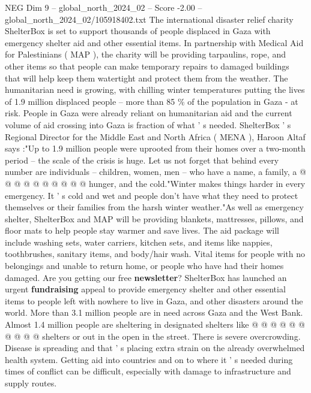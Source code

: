 \begin{textsample}{NEG Dim 9 – global\_north\_2024\_02 – Score -2.00 – global\_north\_2024\_02/105918402.txt}  \label{ex:f9_neg_239}
The international disaster relief charity ShelterBox is set to support thousands of people displaced in Gaza with emergency shelter aid and other essential items.
In partnership with Medical Aid for Palestinians ( MAP ), the charity will be providing tarpaulins, rope, and other items so that people can make temporary repairs to damaged buildings that will help keep them watertight and protect them from the weather.
The humanitarian need is growing, with chilling winter temperatures putting the lives of 1.9 million displaced people -- more than 85 \% of the population in Gaza - at risk.
People in Gaza were already reliant on humanitarian aid and the current volume of aid crossing into Gaza is fraction of what ' s needed.
ShelterBox ' s Regional Director for the Middle East and North Africa ( MENA ), Haroon Altaf says :"Up to 1.9 million people were uprooted from their homes over a two-month period -- the scale of the crisis is huge.
Let us not forget that behind every number are individuals -- children, women, men -- who have a name, a family, a @ @ @ @ @ @ @ @ @ @ hunger, and the cold."Winter makes things harder in every emergency.
It ' s cold and wet and people don't have what they need to protect themselves or their families from the harsh winter weather."As well as emergency shelter, ShelterBox and MAP will be providing blankets, mattresses, pillows, and floor mats to help people stay warmer and save lives.
The aid package will include washing sets, water carriers, kitchen sets, and items like nappies, toothbrushes, sanitary items, and body/hair wash.
Vital items for people with no belongings and unable to return home, or people who have had their homes damaged.
Are you getting our free \textbf{newsletter}?
ShelterBox has launched an urgent \textbf{fundraising} appeal to provide emergency shelter and other essential items to people left with nowhere to live in Gaza, and other disasters around the world.
More than 3.1 million people are in need across Gaza and the West Bank.
Almost 1.4 million people are sheltering in designated shelters like @ @ @ @ @ @ @ @ @ @ shelters or out in the open in the street.
There is severe overcrowding.
Disease is spreading and that ' s placing extra strain on the already overwhelmed health system.
Getting aid into countries and on to where it ' s needed during times of conflict can be difficult, especially with damage to infrastructure and supply routes.

\end{textsample}
